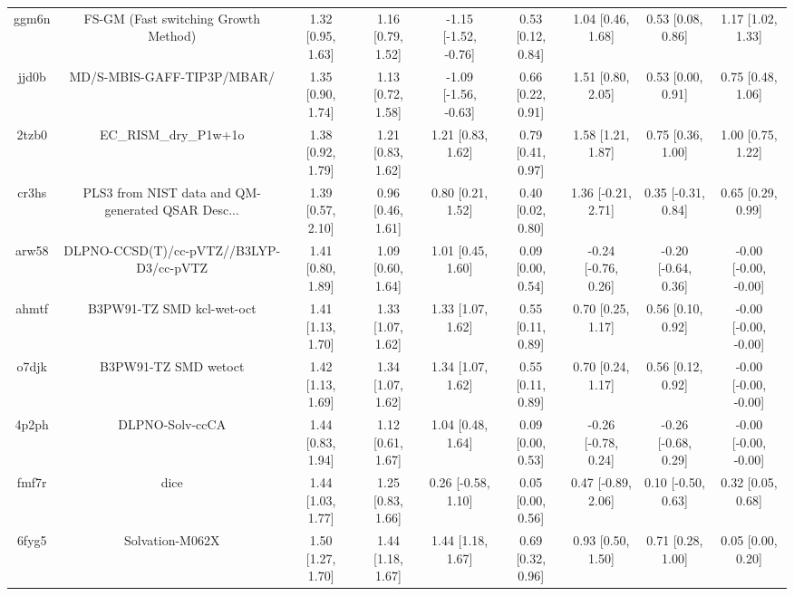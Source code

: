 \documentclass{article}
\begin{document}
\begin{center}
\begin{longtable}{|ccccccccc|}
 ggm6n &               FS-GM (Fast switching Growth Method) &  1.32 [0.95, 1.63] &  1.16 [0.79, 1.52] &  -1.15 [-1.52, -0.76] &  0.53 [0.12, 0.84] &    1.04 [0.46, 1.68] &    0.53 [0.08, 0.86] &     1.17 [1.02, 1.33] \\
 jjd0b &                         MD/S-MBIS-GAFF-TIP3P/MBAR/ &  1.35 [0.90, 1.74] &  1.13 [0.72, 1.58] &  -1.09 [-1.56, -0.63] &  0.66 [0.22, 0.91] &    1.51 [0.80, 2.05] &    0.53 [0.00, 0.91] &     0.75 [0.48, 1.06] \\
 2tzb0 &                              EC\_RISM\_dry\_P1w+1o &  1.38 [0.92, 1.79] &  1.21 [0.83, 1.62] &     1.21 [0.83, 1.62] &  0.79 [0.41, 0.97] &    1.58 [1.21, 1.87] &    0.75 [0.36, 1.00] &     1.00 [0.75, 1.22] \\
 cr3hs &  PLS3 from NIST data and QM-generated QSAR Desc... &  1.39 [0.57, 2.10] &  0.96 [0.46, 1.61] &     0.80 [0.21, 1.52] &  0.40 [0.02, 0.80] &   1.36 [-0.21, 2.71] &   0.35 [-0.31, 0.84] &     0.65 [0.29, 0.99] \\
 arw58 &            DLPNO-CCSD(T)/cc-pVTZ//B3LYP-D3/cc-pVTZ &  1.41 [0.80, 1.89] &  1.09 [0.60, 1.64] &     1.01 [0.45, 1.60] &  0.09 [0.00, 0.54] &  -0.24 [-0.76, 0.26] &  -0.20 [-0.64, 0.36] &  -0.00 [-0.00, -0.00] \\
 ahmtf &                          B3PW91-TZ SMD kcl-wet-oct &  1.41 [1.13, 1.70] &  1.33 [1.07, 1.62] &     1.33 [1.07, 1.62] &  0.55 [0.11, 0.89] &    0.70 [0.25, 1.17] &    0.56 [0.10, 0.92] &  -0.00 [-0.00, -0.00] \\
 o7djk &                               B3PW91-TZ SMD wetoct &  1.42 [1.13, 1.69] &  1.34 [1.07, 1.62] &     1.34 [1.07, 1.62] &  0.55 [0.11, 0.89] &    0.70 [0.24, 1.17] &    0.56 [0.12, 0.92] &  -0.00 [-0.00, -0.00] \\
 4p2ph &                                    DLPNO-Solv-ccCA &  1.44 [0.83, 1.94] &  1.12 [0.61, 1.67] &     1.04 [0.48, 1.64] &  0.09 [0.00, 0.53] &  -0.26 [-0.78, 0.24] &  -0.26 [-0.68, 0.29] &  -0.00 [-0.00, -0.00] \\
 fmf7r &                                               dice &  1.44 [1.03, 1.77] &  1.25 [0.83, 1.66] &    0.26 [-0.58, 1.10] &  0.05 [0.00, 0.56] &   0.47 [-0.89, 2.06] &   0.10 [-0.50, 0.63] &     0.32 [0.05, 0.68] \\
 6fyg5 &                                    Solvation-M062X &  1.50 [1.27, 1.70] &  1.44 [1.18, 1.67] &     1.44 [1.18, 1.67] &  0.69 [0.32, 0.96] &    0.93 [0.50, 1.50] &    0.71 [0.28, 1.00] &     0.05 [0.00, 0.20] \\

\end{longtable}
\end{center}
\end{document}
